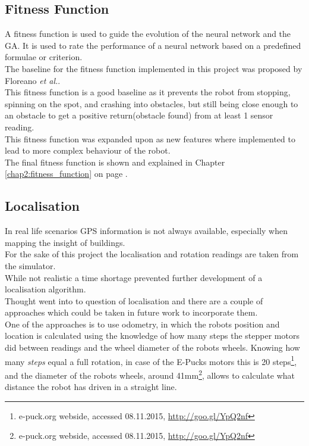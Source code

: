 \subsection{Fitness Function}
A fitness function is used to guide the evolution of the neural network and the GA. It is used to rate the performance of a neural network based on a predefined formulae or criterion.\\
The baseline for the fitness function implemented in this project was proposed by Floreano \textit{et al.}\cite{499791}. \\
This fitness function is a good baseline as it prevents the robot from stopping, spinning on the spot, and crashing into obstacles, but still being close enough to an obstacle to get a positive return(obstacle found) from at least 1 sensor reading. \\
This fitness function was expanded upon as new features where implemented to lead to more complex behaviour of the robot.\\
The final fitness function is shown and explained in Chapter \ref{chap2:fitness_function} on page \pageref{chap2:fitness_function}.

\subsection{Localisation}
In real life scenarios GPS information is not always available, especially when mapping the insight of buildings. \\
For the sake of this project the localisation and rotation readings are taken from the simulator. \\

While not realistic a time shortage prevented further development of a localisation algorithm.\\
Thought went into to question of localisation and there are a couple of approaches which could be taken in future work to incorporate them. \\
One of the approaches is to use odometry, in which the robots position and location is calculated using the knowledge of how many steps the stepper motors did between readings and the wheel diameter of the robots wheels. Knowing how many \textit{steps} equal a full rotation, in case of the E-Pucks motors this is 20 steps\footnote{e-puck.org webside, accessed 08.11.2015, \url{http://goo.gl/YpQ2nf}}, and the diameter of the robots wheels, around 41mm\footnote{e-puck.org webside, accessed 08.11.2015, \url{http://goo.gl/YpQ2nf}}, allows to calculate what distance the robot has driven in a straight line. \\

